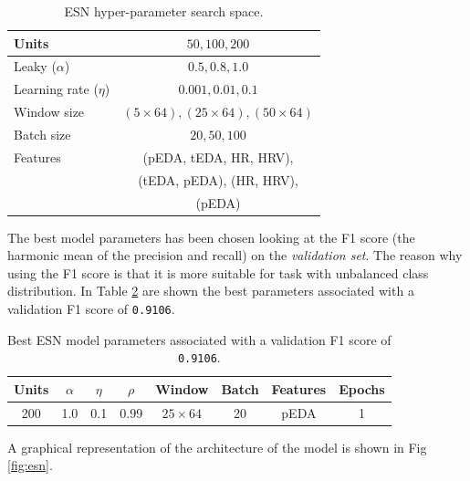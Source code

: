 {\renewcommand{\arraystretch}{1.5}
\begin{table}[H]
    \centering
    \begin{tabular}{|l||c|}
        \hline
        Units & $50, 100, 200$ \\ \hline
        Leaky ($\alpha$) & $0.5, 0.8, 1.0$ \\ \hline
        Learning rate ($\eta$) & $0.001, 0.01, 0.1$ \\ \hline
        Window size & $(5\times 64), (25\times 64), (50\times 64)$ \\ \hline
        Batch size & $20, 50, 100$ \\ \hline
        Features & (pEDA, tEDA, HR, HRV), \\
        & (tEDA, pEDA), (HR, HRV), \\
        & (pEDA) \\ \hline
    \end{tabular}
    \caption{ESN hyper-parameter search space.}
    \label{tab:grid_search}
\end{table}


The best model parameters has been chosen looking at the F1 score (the harmonic mean of the precision and recall) on the \textit{validation set}. The reason why using the F1 score is that it is more suitable for task with unbalanced class distribution. In Table \ref{tab:best_model} are shown the best parameters associated with a validation F1 score of \texttt{0.9106}.

{\renewcommand{\arraystretch}{1.5}
\begin{table}[H]
    \centering
    \begin{tabular}{|c|c|c|c|c|c|c|c|}
        \hline
        Units & $\alpha$ & $\eta$ & $\rho$ & Window & Batch & Features & Epochs \\ \hline\hline
        200 & 1.0 & 0.1 & 0.99 & $25\times 64$ & 20 & pEDA & 1 \\ \hline
    \end{tabular}
    \caption{Best ESN model parameters associated with a validation F1 score of \texttt{0.9106}.}
    \label{tab:best_model}
\end{table}

A graphical representation of the  architecture of the model is shown in Fig \ref{fig:esn}.

}}

